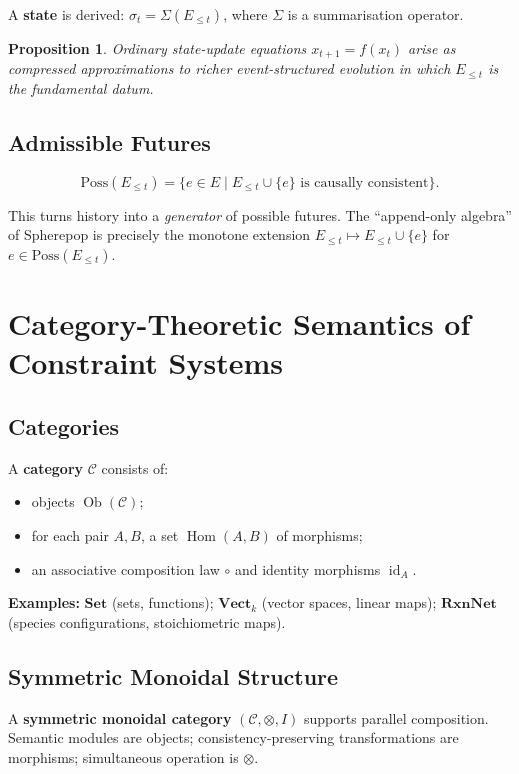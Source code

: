 \documentclass[11pt, openany]{book}
\theoremstyle{plain}
\newtheorem{proposition}[theorem]{Proposition}
\theoremstyle{definition}
\theoremstyle{remark}
\DeclareMathOperator{\Hom}{Hom}
\DeclareMathOperator{\Ob}{Ob}
\DeclareMathOperator{\id}{id}
\begin{document}
A \textbf{state} is derived:
$\sigma_t=\Sigma(E_{\le t})$, where $\Sigma$ is a summarisation operator.

\begin{proposition}
Ordinary state-update equations $x_{t+1}=f(x_t)$ arise as compressed
approximations to richer event-structured evolution in which $E_{\le t}$
is the fundamental datum.
\end{proposition}

\section{Admissible Futures}

\[
  \mathrm{Poss}(E_{\le t})
  =\{e\in E\mid E_{\le t}\cup\{e\}\text{ is causally consistent}\}.
\]

This turns history into a \emph{generator} of possible futures. The
``append-only algebra'' of Spherepop is precisely the monotone extension
$E_{\le t}\mapsto E_{\le t}\cup\{e\}$ for $e\in\mathrm{Poss}(E_{\le t})$.

\chapter{Category-Theoretic Semantics of Constraint Systems}

\section{Categories}

A \textbf{category} $\mathcal{C}$ consists of:
\begin{itemize}
  \item objects $\Ob(\mathcal{C})$;
  \item for each pair $A,B$, a set $\Hom(A,B)$ of morphisms;
  \item an associative composition law $\circ$ and identity morphisms $\id_A$.
\end{itemize}

\textbf{Examples:} $\mathbf{Set}$ (sets, functions); $\mathbf{Vect}_k$
(vector spaces, linear maps); $\mathbf{RxnNet}$ (species configurations,
stoichiometric maps).

\section{Symmetric Monoidal Structure}

A \textbf{symmetric monoidal category} $(\mathcal{C},\otimes,I)$ supports
parallel composition. Semantic modules are objects; consistency-preserving
transformations are morphisms; simultaneous operation is $\otimes$.
\end{document}
